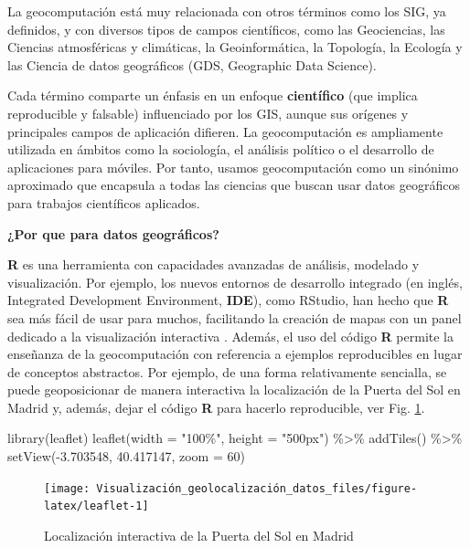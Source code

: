 \documentclass[
]{book}
\newenvironment{Shaded}{\begin{snugshade}}{\end{snugshade}}
\newcommand{\AttributeTok}[1]{\textcolor[rgb]{0.77,0.63,0.00}{#1}}
\newcommand{\DecValTok}[1]{\textcolor[rgb]{0.00,0.00,0.81}{#1}}
\newcommand{\FloatTok}[1]{\textcolor[rgb]{0.00,0.00,0.81}{#1}}
\newcommand{\FunctionTok}[1]{\textcolor[rgb]{0.00,0.00,0.00}{#1}}
\newcommand{\NormalTok}[1]{#1}
\newcommand{\SpecialCharTok}[1]{\textcolor[rgb]{0.00,0.00,0.00}{#1}}
\newcommand{\StringTok}[1]{\textcolor[rgb]{0.31,0.60,0.02}{#1}}
\theoremstyle{definition}
\theoremstyle{definition}
\theoremstyle{definition}
\theoremstyle{definition}
\theoremstyle{remark}
\begin{document}
La geocomputación está muy relacionada con otros términos como los SIG, ya
definidos, y con diversos tipos de campos científicos, como las Geociencias, las
Ciencias atmosféricas y climáticas, la Geoinformática, la Topología, la Ecología
y las Ciencia de datos geográficos (GDS, Geographic Data Science).

Cada término comparte un énfasis en un enfoque \textbf{científico} (que implica
reproducible y falsable) influenciado por los GIS, aunque sus orígenes y
principales campos de aplicación difieren. La geocomputación es ampliamente
utilizada en ámbitos como la sociología, el análisis político o el desarrollo de
aplicaciones para móviles. Por tanto, usamos geocomputación como un sinónimo
aproximado que encapsula a todas las ciencias que buscan usar datos geográficos
para trabajos científicos aplicados.

\textbf{¿Por que  para datos geográficos?}

\textbf{R} es una herramienta con capacidades avanzadas de análisis, modelado y
visualización. Por ejemplo, los nuevos entornos de desarrollo integrado (en
inglés, Integrated Development Environment, \textbf{IDE}), como RStudio, han hecho
que \textbf{R} sea más fácil de usar para muchos, facilitando la creación de mapas
con un panel dedicado a la visualización interactiva \citep{Lovelance_et_al_2019}.
Además, el uso del código \textbf{R} permite la enseñanza de la geocomputación con
referencia a ejemplos reproducibles en lugar de conceptos abstractos. Por
ejemplo, de una forma relativamente sencialla, se puede geoposicionar de manera
interactiva la localización de la Puerta del Sol en Madrid y, además, dejar el
código \textbf{R} para hacerlo reproducible, ver Fig. \ref{fig:leaflet}.

\begin{Shaded}
\begin{Highlighting}[]
\FunctionTok{library}\NormalTok{(leaflet)}
\FunctionTok{leaflet}\NormalTok{(}\AttributeTok{width =} \StringTok{"100\%"}\NormalTok{, }\AttributeTok{height =} \StringTok{"500px"}\NormalTok{) }\SpecialCharTok{\%\textgreater{}\%}
  \FunctionTok{addTiles}\NormalTok{() }\SpecialCharTok{\%\textgreater{}\%}
  \FunctionTok{setView}\NormalTok{(}\SpecialCharTok{{-}}\FloatTok{3.703548}\NormalTok{, }\FloatTok{40.417147}\NormalTok{, }\AttributeTok{zoom =} \DecValTok{60}\NormalTok{)}
\end{Highlighting}
\end{Shaded}

\begin{figure}

{\centering \texttt{[image: Visualización\_geolocalización\_datos\_files/figure-latex/leaflet-1]} 

}

\caption{Localización interactiva de la Puerta del Sol en Madrid}\label{fig:leaflet}
\end{figure}
\end{document}
